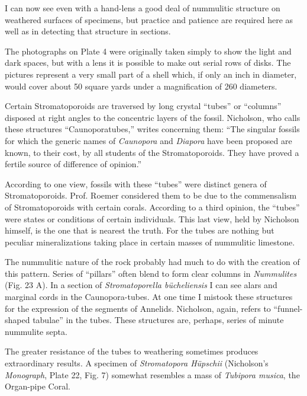 \documentclass[a4paper, 12pt, oneside]{article}
\begin{document}
I can now see even with a hand-lens a good deal of nummulitic structure on weathered surfaces of specimens, but practice and patience are required here as well as in detecting that structure in sections.

The photographs on Plate 4 were originally taken simply to show the light and dark spaces, but with a lens it is possible to make out serial rows of disks. The pictures represent a very small part of a shell which, if only an inch in diameter, would cover about 50 square yards under a magnification of 260 diameters.

Certain Stromatoporoids are traversed by long crystal ``tubes'' or ``columns'' disposed at right angles to the concentric layers of the fossil. Nicholson, who calls these structures ``Caunoporatubes,'' writes concerning them: ``The singular fossils for which the generic names of \emph{Caunopora} and \emph{Diapora} have been proposed are known, to their cost, by all students of the Stromatoporoids. They have proved a fertile source of difference of opinion.''

According to one view, fossils with these ``tubes'' were distinct genera of Stromatoporoids. Prof. Roemer considered them to be due to the commensalism of Stromatoporoids with certain corals. According to a third opinion, the ``tubes'' were states or conditions of certain individuals. This last view, held by Nicholson himself, is the one that is nearest the truth. For the tubes are nothing but peculiar mineralizations taking place in certain masses of nummulitic limestone.

The nummulitic nature of the rock probably had much to do with the creation of this pattern. Series of ``pillars'' often blend to form clear columns in \emph{Nummulites} (Fig. 23 A). In a section of \emph{Stromatoporella bücheliensis} I can see alars and marginal cords in the Caunopora-tubes. At one time I mistook these structures for the expression of the segments of Annelids. Nicholson, again, refers to ``funnel-shaped tabulae'' in the tubes. These structures are, perhaps, series of minute nummulite septa.

The greater resistance of the tubes to weathering sometimes produces extraordinary results. A specimen of \emph{Stromatopora Hüpschii} (Nicholson's \emph{Monograph}, Plate 22, Fig. 7) somewhat resembles a mass of \emph{Tubipora musica}, the Organ-pipe Coral.
\end{document}
